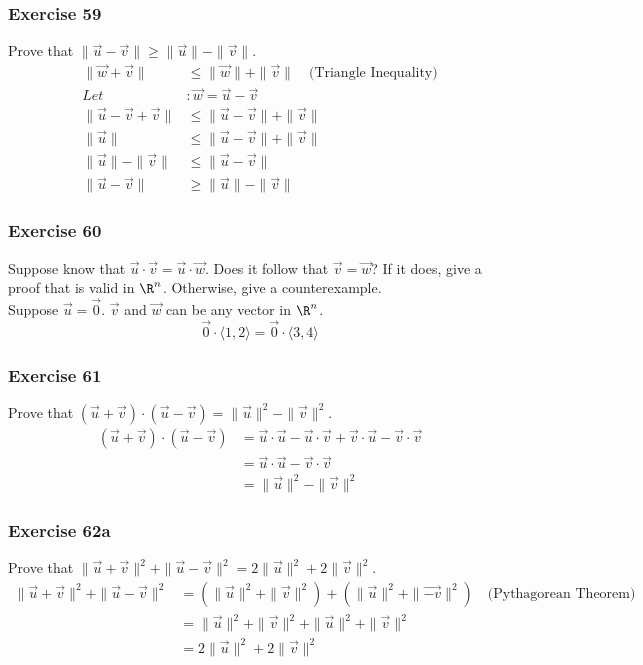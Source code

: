 \documentclass[letterpaper, 12pt]{math}
\begin{document}
\subsubsection*{Exercise 59}
Prove that \( \|\vec{u}-\vec{v}\| \ge \|\vec{u}\|-\|\vec{v}\| \).
\begin{align*}
  \|\vec{w}+\vec{v}\| &\le \|\vec{w}\|+\|\vec{v}\|
    \quad\text{(Triangle Inequality)} \\
  Let&: \vec{w} = \vec{u}-\vec{v} \\
  \|\vec{u}-\vec{v}+\vec{v}\| &\le \|\vec{u}-\vec{v}\|+\|\vec{v}\| \\
  \|\vec{u}\| &\le \|\vec{u}-\vec{v}\|+\|\vec{v}\| \\
  \|\vec{u}\|-\|\vec{v}\| &\le \|\vec{u}-\vec{v}\| \\
  \|\vec{u}-\vec{v}\| &\ge \|\vec{u}\|-\|\vec{v}\|
\end{align*}

\subsubsection*{Exercise 60}
Suppose know that \( \vec{u}\cdot\vec{v} = \vec{u}\cdot\vec{w} \). Does it
follow that \( \vec{v} = \vec{w} \)? If it does, give a proof that is valid
in \( \R^n \). Otherwise, give a counterexample. \\
Suppose \( \vec{u} = \vec{0} \). \( \vec{v} \) and \( \vec{w} \) can be any
vector in \( \R^n \).
\[ \vec{0}\cdot\langle1,2\rangle = \vec{0}\cdot\langle3,4\rangle \]

\subsubsection*{Exercise 61}
Prove that \( (\vec{u}+\vec{v})\cdot(\vec{u}-\vec{v}) =
\|\vec{u}\|^2-\|\vec{v}\|^2 \).
\begin{align*}
  (\vec{u}+\vec{v})\cdot(\vec{u}-\vec{v}) &= \vec{u}\cdot\vec{u}-
    \vec{u}\cdot\vec{v}+\vec{v}\cdot\vec{u}-\vec{v}\cdot\vec{v} \\
  &= \vec{u}\cdot\vec{u}-\vec{v}\cdot\vec{v} \\
  &= \|\vec{u}\|^2-\|\vec{v}\|^2
\end{align*}

\subsubsection*{Exercise 62a}
Prove that \( \|\vec{u}+\vec{v}\|^2+\|\vec{u}-\vec{v}\|^2 = 2\|\vec{u}\|^2+
2\|\vec{v}\|^2 \).
\begin{align*}
  \|\vec{u}+\vec{v}\|^2+\|\vec{u}-\vec{v}\|^2 &=
    (\|\vec{u}\|^2+\|\vec{v}\|^2)+(\|\vec{u}\|^2+\|\vec{-v}\|^2)
    \quad\text{(Pythagorean Theorem)} \\
  &= \|\vec{u}\|^2+\|\vec{v}\|^2+\|\vec{u}\|^2+\|\vec{v}\|^2 \\
  &= 2\|\vec{u}\|^2+2\|\vec{v}\|^2
\end{align*}
\end{document}
